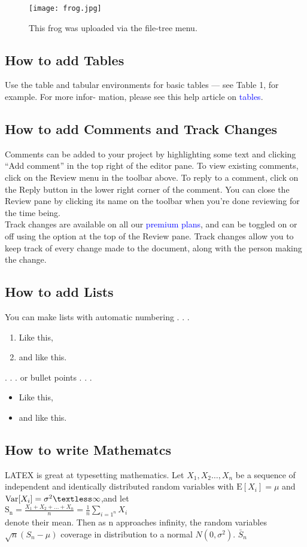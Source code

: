 \documentclass{article}
\begin{document}
	\begin{figure}
		\centering
		\texttt{[image: frog.jpg]}
		\caption{This frog was uploaded via the file-tree menu.}
	\end{figure}
\vspace{5cm}

\subsection{ How to add Tables}
Use the table and tabular environments for basic tables — see Table 1, for example. For more infor-
mation, please see this help article on {\textcolor{blue}{tables}}.

\subsection{How to add Comments and Track Changes}
Comments can be added to your project by highlighting some text and clicking “Add comment” in
the top right of the editor pane. To view existing comments, click on the Review menu in the toolbar
above. To reply to a comment, click on the Reply button in the lower right corner of the comment.
You can close the Review pane by clicking its name on the toolbar when you’re done reviewing for the
time being.\\
Track changes are available on all our {\textcolor{blue}{premium plans}}, and can be toggled on or off using the option
at the top of the Review pane. Track changes allow you to keep track of every change made to the
document, along with the person making the change.

\subsection{How to add Lists}
You can make lists with automatic numbering . . .

\begin{enumerate}
		\item Like this,
		\item and like this.
\end{enumerate}
	. . . or bullet points . . .
\begin{itemize}
	\item Like this,
	\item and like this.	
\end{itemize}

\subsection{How to write Mathematcs}
LATEX is great at typesetting mathematics. Let $X_1,X_2\ldots,X_n$ be a sequence of independent and
identically distributed random variables with $\mathrm{E}[X_i]=\mu$ and $\mathrm{Var}[X_i]=\sigma^2 \textless \infty$,and let \\
$\mathrm{S_n}=\frac{X_1+X_2+\ldots+X_n}{n}=\frac{1}{n}\sum_{i=1^n}X_i$
\\
denote their mean. Then as n approaches infinity, the random variables $\sqrt{n}(S_n - \mu)$ coverage in distribution to a normal $N(0,\sigma^2)$. ${\bar S_n}$
\end{document}

